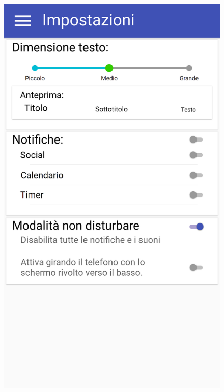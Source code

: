 \begin{figure}[H]
\begin{minipage}{.49\textwidth}
		\includegraphics[width=\textwidth]{img/wireframe/impostazioni_notifiche_disabilitate.png}
	\end{minipage}
\end{figure}
